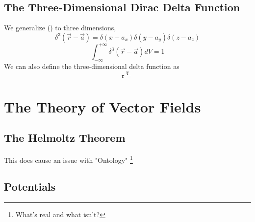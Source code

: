 \subsection{The Three-Dimensional Dirac Delta Function}
We generalize () to three dimensions,
\begin{equation}
\delta^{3}(\vec{r} - \vec{a}) = \delta(x-a_{x})\delta(y-a_{y})\delta(z-a_{z})
\end{equation}
\begin{equation}
\int_{- \infty}^{+ \infty} \delta^{3}(\vec{r} - \vec{a}) dV = 1
\end{equation}
We can also define the three-dimensional delta function as
\begin{equation}
\mathfrak{r}
\end{equation}
$$\mathfrak{r} = $$
\section{The Theory of Vector Fields}
\subsection{The Helmoltz Theorem}
This does cause an issue with "Ontology" \footnote{What's real and what isn't?}
\subsection{Potentials}